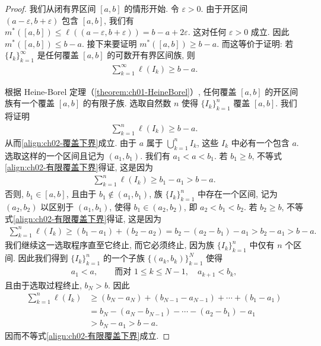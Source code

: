 \documentclass[../../main.tex]{subfiles}
\begin{document}
\begin{proof}
我们从闭有界区间 $[a,b]$ 的情形开始. 令 $\varepsilon>0$. 由于开区间 $(a-\varepsilon,b+\varepsilon)$ 包含 $[a,b]$, 我们有 $m^{*}([a,b])\leqslant\ell((a-\varepsilon,b+\varepsilon))=b-a+2\varepsilon$. 这对任何 $\varepsilon>0$ 成立. 因此 $m^{*}([a,b])\leqslant b-a$. 接下来要证明 $m^{*}([a,b])\geqslant b-a$. 而这等价于证明: 若 $\{I_{k}\}_{k=1}^{\infty}$ 是任何覆盖 $[a,b]$ 的可数开有界区间族, 则
\begin{align}
\sum_{k=1}^{\infty}\ell(I_{k})\geqslant b-a.\label{align:ch02-覆盖下界}
\end{align}

根据 Heine-Borel 定理（\cref{theorem:ch01-HeineBorel}）, 任何覆盖 $[a,b]$ 的开区间族有一个覆盖 $[a,b]$ 的有限子族. 选取自然数 $n$ 使得 $\{I_{k}\}_{k=1}^{n}$ 覆盖 $[a,b]$. 我们将证明
\begin{align}
\sum_{k=1}^{n}\ell(I_{k})\geqslant b-a.\label{align:ch02-有限覆盖下界}
\end{align}
从而\eqref{align:ch02-覆盖下界}成立. 由于 $a$ 属于 $\bigcup_{k=1}^{n}I_{k}$, 这些 $I_{k}$ 中必有一个包含 $a$. 选取这样的一个区间且记为 $(a_{1},b_{1})$. 我们有 $a_{1}<a<b_{1}$. 若 $b_{1}\geqslant b$, 不等式\eqref{align:ch02-有限覆盖下界}得证, 这是因为
\begin{align*}
\sum_{k=1}^{n}\ell(I_{k})\geqslant b_{1}-a_{1}>b-a.
\end{align*}
否则, $b_{1}\in[a,b]$, 且由于 $b_{1}\notin(a_{1},b_{1})$, 族 $\{I_{k}\}_{k=1}^{n}$ 中存在一个区间, 记为 $(a_{2},b_{2})$ 以区别于 $(a_{1},b_{1})$, 使得 $b_{1}\in(a_{2},b_{2})$, 即 $a_{2}<b_{1}<b_{2}$. 若 $b_{2}\geqslant b$, 不等式\eqref{align:ch02-有限覆盖下界}得证, 这是因为
\begin{align*}
\sum_{k=1}^{n}\ell(I_{k})\geqslant(b_{1}-a_{1})+(b_{2}-a_{2})=b_{2}-(a_{2}-b_{1})-a_{1}>b_{2}-a_{1}>b-a.
\end{align*}
我们继续这一选取程序直至它终止, 而它必须终止, 因为族 $\{I_{k}\}_{k=1}^{n}$ 中仅有 $n$ 个区间. 因此我们得到 $\{I_{k}\}_{k=1}^{n}$ 的一个子族 $\{(a_{k},b_{k})\}_{k=1}^{N}$ 使得
\begin{align*}
a_{1}<a,\qquad\text{而对 }1\leqslant k\leqslant N-1,\quad a_{k+1}<b_{k},
\end{align*}
且由于选取过程终止, $b_{N}>b$. 因此
\begin{align*}
\sum_{k=1}^{n}\ell(I_{k})&\geqslant(b_{N}-a_{N})+(b_{N-1}-a_{N-1})+\cdots+(b_{1}-a_{1})\\
&=b_{N}-(a_{N}-b_{N-1})-\cdots-(a_{2}-b_{1})-a_{1}\\
&>b_{N}-a_{1}>b-a.
\end{align*}
因而不等式\eqref{align:ch02-有限覆盖下界}成立.


\end{proof}
\end{document}
